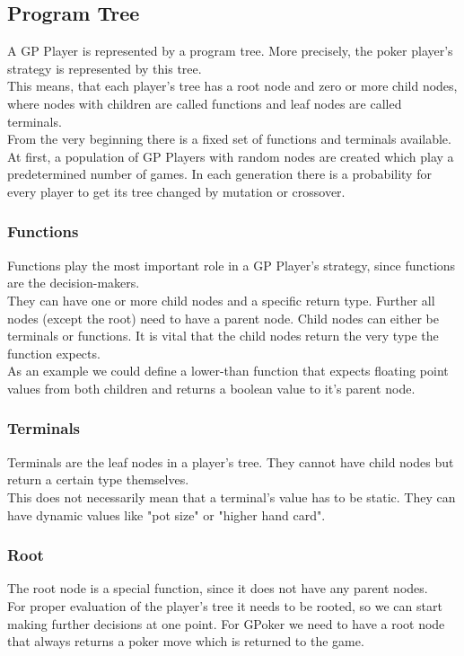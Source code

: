 \documentclass[12pt,fleqn,a4paper]{article}
\begin{document}
\subsection{Program Tree}
A GP Player is represented by a program tree. More precisely, the poker player's strategy is represented by this tree.\\
This means, that each player's tree has a root node and zero or more child nodes, where nodes with children are called functions and leaf nodes are called terminals.\\
From the very beginning there is a fixed set of functions and terminals available.
At first, a population of GP Players with random nodes are created which play a predetermined number of games.
In each generation there is a probability for every player to get its tree changed by mutation or crossover.


\subsubsection{Functions}
\label{sssec:functions}
Functions play the most important role in a GP Player's strategy, since functions are the decision-makers.\\
They can have one or more child nodes and a specific return type. Further all nodes (except the root)  need to have a parent node.
Child nodes can either be terminals or functions. It is vital that the child nodes return the very type the function expects.\\
As an example we could define a lower-than function that expects floating point values from both children and returns a boolean value to it's parent node.

\subsubsection{Terminals}
Terminals are the leaf nodes in a player's tree. They cannot have child nodes but return a certain type themselves.\\
This does not necessarily mean that a terminal's value has to be static. They can have dynamic values like "pot size" or "higher hand card".

\subsubsection{Root}
The root node is a special function, since it does not have any parent nodes.\\
For proper evaluation of the player's tree it needs to be rooted, so we can start making further decisions at one point.
For GPoker we need to have a root node that always returns a poker move which is returned to the game.\\
\end{document}

